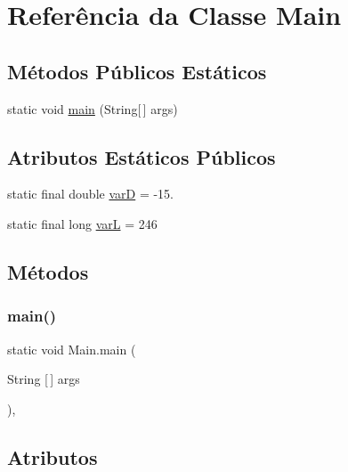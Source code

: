 \hypertarget{classMain}{}\section{Referência da Classe Main}
\label{classMain}
\subsection*{Métodos Públicos Estáticos}
\begin{DoxyCompactItemize}
\item 
static void \hyperlink{classMain_a8a5d0f827edddff706cc0e6740d0579a}{main} (String\mbox{[}$\,$\mbox{]} args)
\end{DoxyCompactItemize}
\subsection*{Atributos Estáticos Públicos}
\begin{DoxyCompactItemize}
\item 
static final double \hyperlink{classMain_a93ce78827008b629fd0afc68309b9413}{varD} = -\/15.
\item 
static final long \hyperlink{classMain_ae9ca95a4f1cfc8a167b4afd7af44b17e}{varL} = 246
\end{DoxyCompactItemize}


\subsection{Métodos}
\mbox{\label{classMain_a8a5d0f827edddff706cc0e6740d0579a}} 
\subsubsection{\texorpdfstring{main()}{main()}}
{\footnotesize\ttfamily static void Main.\+main (\begin{DoxyParamCaption}\item[{String \mbox{[}$\,$\mbox{]}}]{args }\end{DoxyParamCaption})\hspace{0.3cm}{\ttfamily [inline]}, {\ttfamily [static]}}



\subsection{Atributos}
\mbox{\label{classMain_a93ce78827008b629fd0afc68309b9413}} 
